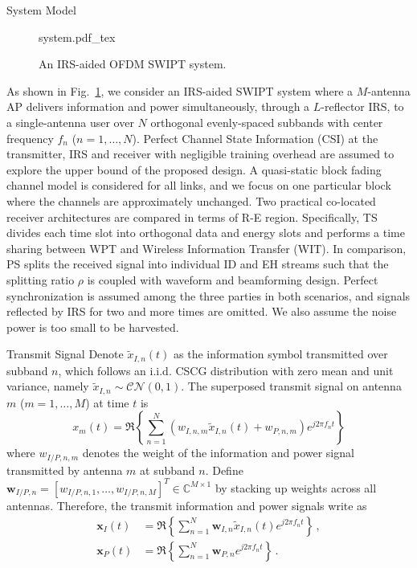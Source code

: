 \documentclass[journal]{IEEEtran}
\begin{document}
	\begin{section}{System Model}\label{se:system_model}
		\begin{figure}[!t]
			\centering
			\def\svgwidth{\columnwidth}
			{system.pdf_tex}
			\caption{An IRS-aided OFDM SWIPT system.}
			\label{fi:system}
		\end{figure}

		As shown in Fig.~\ref{fi:system}, we consider an IRS-aided SWIPT system where a $M$-antenna AP delivers information and power simultaneously, through a $L$-reflector IRS, to a single-antenna user over $N$ orthogonal evenly-spaced subbands with center frequency $f_n$ ($n=1,\dots,N$). Perfect Channel State Information (CSI) at the transmitter, IRS and receiver with negligible training overhead are assumed to explore the upper bound of the proposed design. A quasi-static block fading channel model is considered for all links, and we focus on one particular block where the channels are approximately unchanged. Two practical co-located receiver architectures are compared in terms of R-E region. Specifically, TS divides each time slot into orthogonal data and energy slots and performs a time sharing between WPT and Wireless Information Transfer (WIT). In comparison, PS splits the received signal into individual ID and EH streams such that the splitting ratio $\rho$ is coupled with waveform and beamforming design. Perfect synchronization is assumed among the three parties in both scenarios, and signals reflected by IRS for two and more times are omitted. We also assume the noise power is too small to be harvested.


		\begin{subsection}{Transmit Signal}
			Denote $\tilde{x}_{I,n}(t)$ as the information symbol transmitted over subband $n$, which follows an i.i.d. CSCG distribution with zero mean and unit variance, namely $\tilde{x}_{I,n}\sim\mathcal{CN}(0,1)$. The superposed transmit signal on antenna $m$ ($m=1,\dots,M$) at time $t$ is
			\begin{equation}\label{eq:x_m}
				x_m(t)=\Re\left\{\sum_{n=1}^N\left({w_{I,n,m}\tilde{x}_{I,n}(t)}+w_{P,n,m}\right){e^{j2{\pi}{f_n}{t}}}\right\}
			\end{equation}
			where $w_{I/P,n,m}$ denotes the weight of the information and power signal transmitted by antenna $m$ at subband $n$. Define $\boldsymbol{w}_{I/P,n}=[w_{I/P,n,1},\dots,w_{I/P,n,M}]^T \in \mathbb{C}^{M \times 1}$ by stacking up weights across all antennas. Therefore, the transmit information and power signals write as
			\begin{align}
				\boldsymbol{x}_{I}(t) &= \Re{\left\{\sum_{n=1}^N\boldsymbol{w}_{I,n}\tilde{x}_{I,n}(t){e^{j2{\pi}{f_n}{t}}}\right\}}\,,\label{eq:x_I}\\
				\boldsymbol{x}_{P}(t) &= \Re{\left\{\sum_{n=1}^N\boldsymbol{w}_{P,n}{e^{j2{\pi}{f_n}{t}}}\right\}}\,.\label{eq:x_P}
			\end{align}
		\end{subsection}



\end{section}
\end{document}
